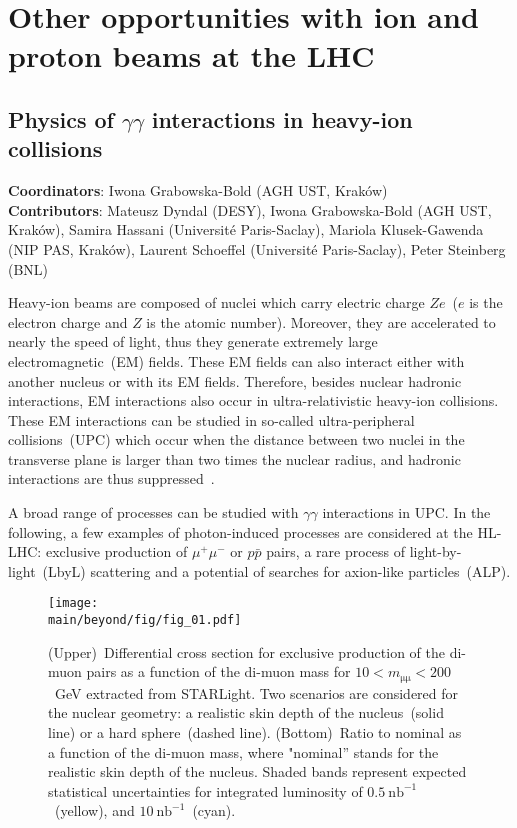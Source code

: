 \documentclass[../report.tex]{subfiles}
\providecommand{\main}{..}
\begin{document}
\section{Other opportunities with ion and proton beams at the LHC}

\subsection{Physics of $\gamma \gamma$ interactions in heavy-ion collisions}
\label{sec:upc}

\textbf{Coordinators}:  Iwona Grabowska-Bold (AGH UST, Krak\'ow)\\
\textbf{Contributors}: Mateusz Dyndal (DESY), Iwona Grabowska-Bold (AGH UST, Krak\'ow), Samira Hassani (Universit\'e Paris-Saclay), Mariola Klusek-Gawenda (NIP PAS, Krak\'ow), Laurent Schoeffel (Universit\'e Paris-Saclay), Peter Steinberg (BNL)

Heavy-ion beams are composed of nuclei which carry electric charge $Ze$~($e$ is the electron charge and $Z$ is the atomic number). Moreover, they are accelerated to nearly the speed of light, thus they generate extremely large electromagnetic~(EM) fields. These EM fields can also interact either with another nucleus or with its EM fields.
Therefore, besides nuclear hadronic interactions, EM
interactions also occur in ultra-relativistic heavy-ion collisions.
These EM interactions can be studied in so-called ultra-peripheral
collisions~(UPC) which occur when the distance between two nuclei in the transverse plane is larger than two times the nuclear radius, and hadronic interactions are thus suppressed~\cite{Bertulani:2005ru}.

A broad range of processes can be studied with $\gamma\gamma$ interactions in UPC. In the following, a few examples of photon-induced processes are considered at the HL-LHC: exclusive production of $\mu^+\mu^-$ or $p\bar{p}$ pairs, a rare process of light-by-light~(LbyL) scattering and a potential of searches for axion-like particles~(ALP).

\begin{figure}[!hbt]
\centering
\texttt{[image: \\main/beyond/fig/fig\_01.pdf]}
\caption{
(Upper)~Differential cross section for exclusive production of the di-muon pairs as a function of the di-muon mass for
$10<m_{\mathrm{\mu\mu}}<200$~GeV extracted from STARLight. Two
scenarios are considered for the nuclear geometry: a realistic skin
depth of the nucleus~(solid line) or a hard sphere~(dashed
line). (Bottom)~Ratio to nominal as a function of the di-muon mass,
where "nominal'' stands for the realistic skin depth of the nucleus.
 Shaded bands represent expected statistical uncertainties for integrated luminosity of $0.5~\mathrm{nb}^{-1}$~(yellow), and $10~\mathrm{nb}^{-1}$~(cyan).}
\label{fig:mumu}
\end{figure}
\end{document}
